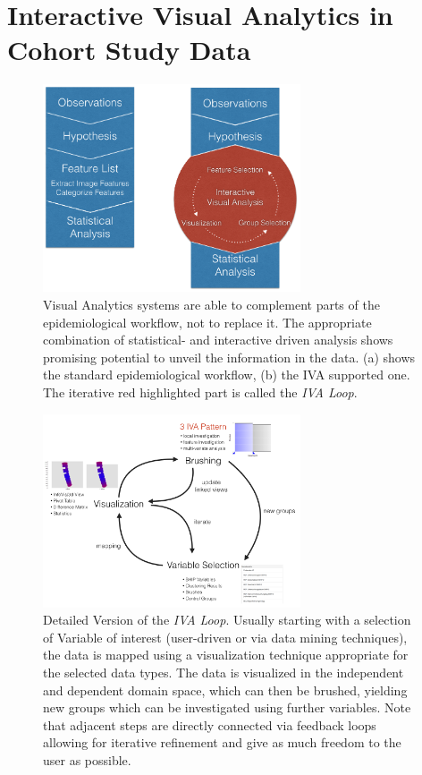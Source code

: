 \documentclass[journal]{style/vgtc}           %
\begin{document}
\section{Interactive Visual Analytics in Cohort Study Data}
\begin{figure}[htb]
 \centering
 \label{fig:WorkflowComparison}
 \includegraphics[width=3.0in]{figures/workflow_comparison}
 \caption{Visual Analytics systems are able to complement parts of the epidemiological workflow, not to replace it. The appropriate combination of statistical- and interactive driven analysis shows promising potential to unveil the information in the data. (a) shows the standard epidemiological workflow, (b) the IVA supported one. The iterative red highlighted part is called the \emph{IVA Loop}.}
\end{figure}
\begin{figure}[htb]
 \centering
 \includegraphics[width=3.0in]{figures/InteractionLoop}
 \caption{Detailed Version of the \emph{IVA Loop}. Usually starting with a selection of Variable of interest (user-driven or via data mining techniques), the data is mapped using a visualization technique appropriate for the selected data types. The data is visualized in the independent and dependent domain space, which can then be brushed, yielding new groups which can be investigated using further variables. Note that adjacent steps are directly connected via feedback loops allowing for iterative refinement and give as much freedom to the user as possible.}
\end{figure}
\end{document}
